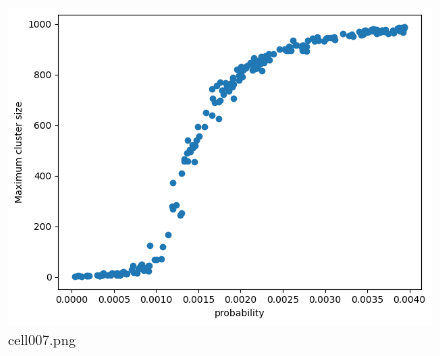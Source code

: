\begin{figure}[ht]
	\centering
	\includegraphics[scale=0.8, max width=\linewidth]{./fig/appendix/graph-theory-network-model/cell007.png}
	\caption{cell007.png}
	\label{cell007.png}
\end{figure}
